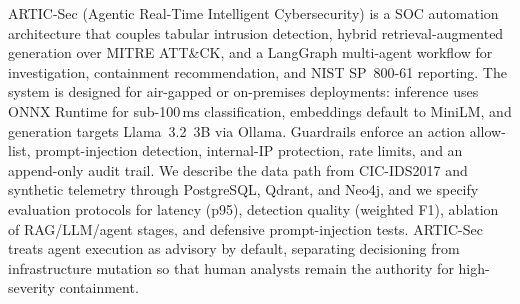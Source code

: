 ARTIC-Sec (Agentic Real-Time Intelligent Cybersecurity) is a SOC automation architecture that couples tabular intrusion detection, hybrid retrieval-augmented generation over MITRE ATT\&CK, and a LangGraph multi-agent workflow for investigation, containment recommendation, and NIST SP~800-61 reporting. The system is designed for air-gapped or on-premises deployments: inference uses ONNX Runtime for sub-100\,ms classification, embeddings default to MiniLM, and generation targets Llama~3.2~3B via Ollama. Guardrails enforce an action allow-list, prompt-injection detection, internal-IP protection, rate limits, and an append-only audit trail. We describe the data path from CIC-IDS2017 and synthetic telemetry through PostgreSQL, Qdrant, and Neo4j, and we specify evaluation protocols for latency (p95), detection quality (weighted F1), ablation of RAG/LLM/agent stages, and defensive prompt-injection tests. ARTIC-Sec treats agent execution as advisory by default, separating decisioning from infrastructure mutation so that human analysts remain the authority for high-severity containment.
